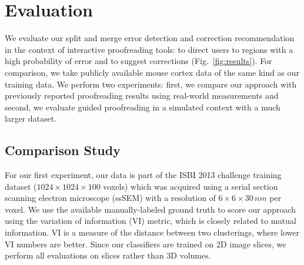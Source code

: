 \section{Evaluation}
\label{sec:evaluation}

We evaluate our split and merge error detection and correction recommendation in the context of interactive proofreading tools: to direct users to regions with a high probability of error and to suggest corrections (Fig.~\ref{fig:results}). For comparison, we take publicly available mouse cortex data of the same kind as our training data. We perform two experiments: first, we compare our approach with previously reported proofreading results using real-world measurements and second, we evaluate guided proofreading in a simulated context with a much larger dataset.

\subsection{Comparison Study}
\label{sec:comparisonstudy}
For our first experiment, our data is part of the ISBI 2013 challenge training dataset ($1024\times1024\times100$ voxels) which was acquired using a serial section scanning electron microscope (ssSEM) with a resolution of $6\times6\times30\, nm$ per voxel. We use the available manually-labeled ground truth to score our approach using the variation of information (VI) metric, which is closely related to mutual information. VI is a measure of the distance between two clusterings, where lower VI numbers are better. Since our classifiers are trained on 2D image slices, we perform all evaluations on slices rather than 3D volumes.

